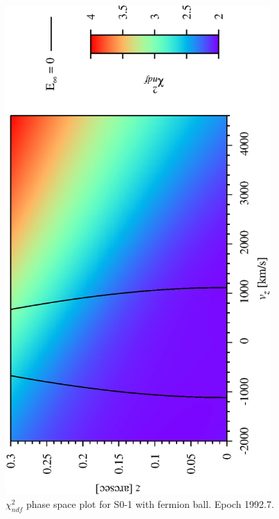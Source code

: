 \begin{figure}[!pb]
	\begin{center}
	\includegraphics[angle=-90,width=0.9\textwidth]{eps/so1-FB-run9.eps}
	\caption{$\chi^2_{ndf}$ phase space plot for S0-1 with fermion ball. Epoch 1992.7.}
	\label{fig_so1FBphasespace}
	\end{center}
\end{figure}

